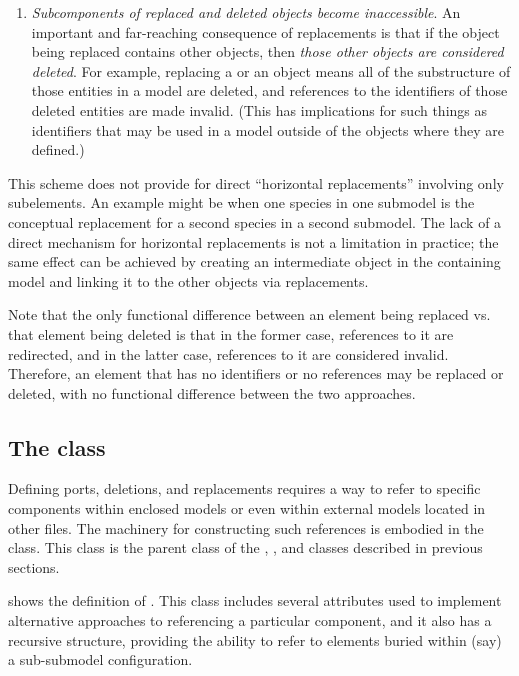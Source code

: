 \begin{enumerate}
\item \emph{Subcomponents of replaced and deleted objects become
    inaccessible}.  An important and far-reaching consequence of
  replacements is that if the object being replaced contains other
  objects, then \emph{those other objects are considered deleted}.  For
  example, replacing a \Reaction or an \Event object means all of the
  substructure of those entities in a model are deleted, and references
  to the identifiers of those deleted entities are made invalid.  (This
  has implications for such things as \SpeciesReference identifiers that
  may be used in a model outside of the \Reaction objects where they are
  defined.)

\end{enumerate}

This scheme does not provide for direct ``horizontal replacements''
involving only subelements.  An example might be when one species in one
submodel is the conceptual replacement for a second species in a second
submodel.  The lack of a direct mechanism for horizontal replacements is
not a limitation in practice; the same effect can be achieved by
creating an intermediate object in the containing model and linking it
to the other objects via replacements.

Note that the only functional difference between an element being replaced
vs. that element being deleted is that in the former case, references
to it are redirected, and in the latter case, references to it are 
considered invalid.  Therefore, an element that has no identifiers or
no references may be replaced or deleted, with no functional difference
between the two approaches.

\subsection{The  class}
\label{sbaseref-class}

Defining ports, deletions, and replacements requires a way to refer to
specific components within enclosed models or even within external models
located in other files.  The machinery for constructing such references
is embodied in the \SBaseRef class.  This class is the parent class of
the \Port, \Deletion, \ReplacedElement and \ReplacedBy classes described
in previous sections.

 shows the definition of \SBaseRef.  This class
includes several attributes used to implement alternative approaches to
referencing a particular component, and it also has a recursive
structure, providing the ability to refer to elements buried within
(say) a sub-submodel configuration.


